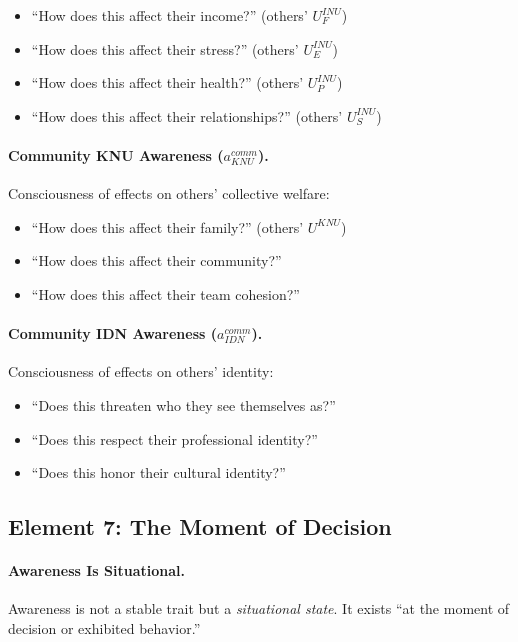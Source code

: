 \begin{itemize}
\item ``How does this affect their income?'' (others' $U^{INU}_F$)
\item ``How does this affect their stress?'' (others' $U^{INU}_E$)
\item ``How does this affect their health?'' (others' $U^{INU}_P$)
\item ``How does this affect their relationships?'' (others' $U^{INU}_S$)
\end{itemize}

\paragraph{Community KNU Awareness ($a^{comm}_{KNU}$).}
Consciousness of effects on others' collective welfare:

\begin{itemize}
\item ``How does this affect their family?'' (others' $U^{KNU}$)
\item ``How does this affect their community?''
\item ``How does this affect their team cohesion?''
\end{itemize}

\paragraph{Community IDN Awareness ($a^{comm}_{IDN}$).}
Consciousness of effects on others' identity:

\begin{itemize}
\item ``Does this threaten who they see themselves as?''
\item ``Does this respect their professional identity?''
\item ``Does this honor their cultural identity?''
\end{itemize}

\subsection{Element 7: The Moment of Decision}
\label{subsec:moment-of-decision}

\paragraph{Awareness Is Situational.}
Awareness is not a stable trait but a \emph{situational state}. It exists 
``at the moment of decision or exhibited behavior.''


